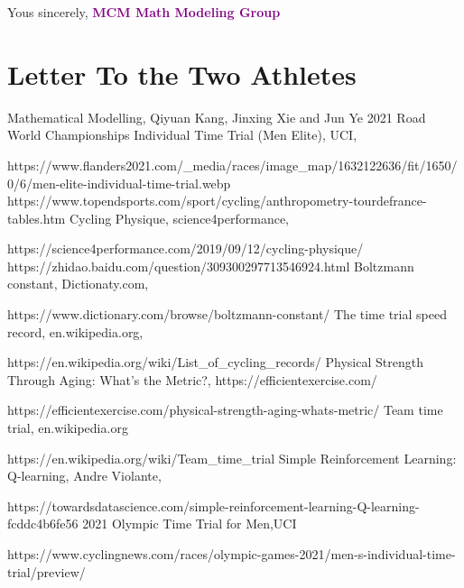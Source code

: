 \documentclass{article}
\begin{document}
	Yous sincerely,
	\textcolor{purple}{\textbf{MCM Math Modeling Group}}
	\newpage
	\section{Letter To the Two Athletes}
	\newpage
	\thispagestyle{empty}
	\renewcommand\refname{References}
	\clearpage
	\begin{thebibliography}{100}
		 Mathematical Modelling, Qiyuan Kang, Jinxing Xie and Jun Ye
		2021 Road World Championships Individual Time Trial (Men Elite), UCI,

		https://www.flanders2021.com/\_media/races/image\_map/1632122636/fit/1650/0/6/men-elite-individual-time-trial.webp
		https://www.topendsports.com/sport/cycling/anthropometry-tourdefrance-tables.htm
		Cycling Physique, science4performance,

		https://science4performance.com/2019/09/12/cycling-physique/
		https://zhidao.baidu.com/question/309300297713546924.html
		Boltzmann constant, Dictionaty.com,

		https://www.dictionary.com/browse/boltzmann-constant/
		The time trial speed record, en.wikipedia.org,

		https://en.wikipedia.org/wiki/List\_of\_cycling\_records/
		Physical Strength Through Aging: What’s the Metric?, https://efficientexercise.com/

		https://efficientexercise.com/physical-strength-aging-whats-metric/
		Team time trial, en.wikipedia.org

		https://en.wikipedia.org/wiki/Team\_time\_trial
		 Simple Reinforcement Learning: Q-learning, Andre Violante,

		 https://towardsdatascience.com/simple-reinforcement-learning-Q-learning-fcddc4b6fe56
		 2021 Olympic Time Trial for Men,UCI

		https://www.cyclingnews.com/races/olympic-games-2021/men-s-individual-time-trial/preview/
	\end{thebibliography}
\end{document}
